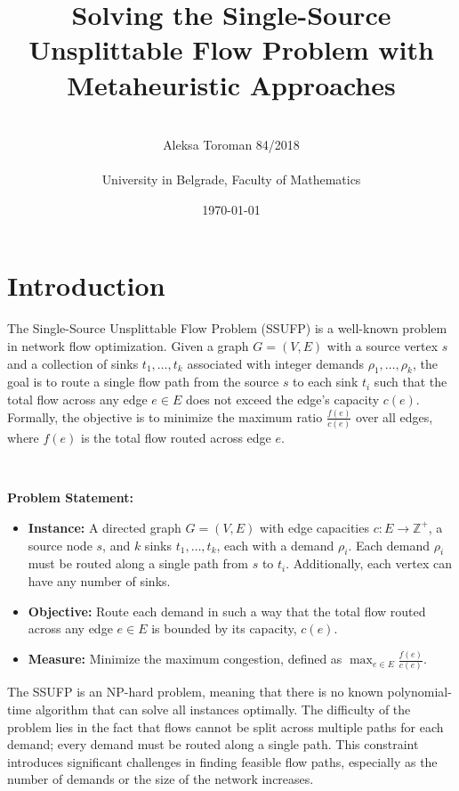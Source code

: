 \documentclass[a4paper,12pt]{article}
\title{Solving the Single-Source Unsplittable Flow Problem with Metaheuristic Approaches}
\author{\\Aleksa Toroman 84/2018 \\\\ University in Belgrade, Faculty of Mathematics}
\date{\today}
\begin{document}
\maketitle

\newpage
\renewcommand{\contentsname}{Table of contents}
\tableofcontents

\newpage

\section{Introduction}

The Single-Source Unsplittable Flow Problem (SSUFP) is a well-known problem in network flow optimization. Given a graph $G = (V, E)$ with a source vertex $s$ and a collection of sinks $t_1, \ldots, t_k$ associated with integer demands $\rho_1, \ldots, \rho_k$, the goal is to route a single flow path from the source $s$ to each sink $t_i$ such that the total flow across any edge $e \in E$ does not exceed the edge’s capacity $c(e)$. Formally, the objective is to minimize the maximum ratio $\frac{f(e)}{c(e)}$ over all edges, where $f(e)$ is the total flow routed across edge $e$.

\

\noindent \textbf{Problem Statement:}

\begin{itemize}
    \item \textbf{Instance:} A directed graph $G=(V, E)$ with edge capacities $c: E \to \mathbb{Z}^+$, a source node $s$, and $k$ sinks $t_1, \ldots, t_k$, each with a demand $\rho_i$. Each demand $\rho_i$ must be routed along a single path from $s$ to $t_i$. Additionally, each vertex can have any number of sinks.
    \item \textbf{Objective:} Route each demand in such a way that the total flow routed across any edge $e \in E$ is bounded by its capacity, $c(e)$.
    \item \textbf{Measure:} Minimize the maximum congestion, defined as $\max_{e \in E} \frac{f(e)}{c(e)}$.
\end{itemize}

\noindent The SSUFP is an NP-hard problem, meaning that there is no known polynomial-time algorithm that can solve all instances optimally. The difficulty of the problem lies in the fact that flows cannot be split across multiple paths for each demand; every demand must be routed along a single path. This constraint introduces significant challenges in finding feasible flow paths, especially as the number of demands or the size of the network increases. \\
\end{document}
